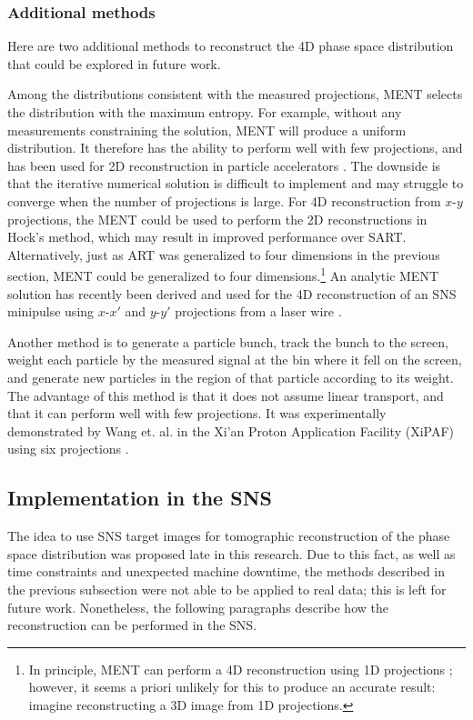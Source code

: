 \subsubsection{Additional methods}

Here are two additional methods to reconstruct the 4D phase space distribution that could be explored in future work.

Among the distributions consistent with the measured projections, MENT selects the distribution with the maximum entropy. For example, without any measurements constraining the solution, MENT will produce a uniform distribution. It therefore has the ability to perform well with few projections, and has been used for 2D reconstruction in particle accelerators \cite{Hock2013a}. The downside is that the iterative numerical solution is difficult to implement and may struggle to converge when the number of projections is large. For 4D reconstruction from $x$-$y$ projections, the MENT could be used to perform the 2D reconstructions in Hock's method, which may result in improved performance over SART. Alternatively, just as ART was generalized to four dimensions in the previous section, MENT could be generalized to four dimensions.\footnote{In principle, MENT can perform a 4D reconstruction using 1D projections \cite{Sander1979}; however, it seems a priori unlikely for this to produce an accurate result: imagine reconstructing a 3D image from 1D projections.} An analytic MENT solution has recently been derived and used for the 4D reconstruction of an SNS minipulse using $x$-$x'$ and $y$-$y'$ projections from a laser wire \cite{Wong-forthcoming}. 

Another method is to generate a particle bunch, track the bunch to the screen, weight each particle by the measured signal at the bin where it fell on the screen, and generate new particles in the region of that particle according to its weight. The advantage of this method is that it does not assume linear transport, and that it can perform well with few projections. It was experimentally demonstrated by Wang et. al. in the Xi’an Proton Application Facility (XiPAF) using six projections \cite{Wang2019}. 



\subsection{Implementation in the SNS}

The idea to use SNS target images for tomographic reconstruction of the phase space distribution was proposed late in this research. Due to this fact, as well as time constraints and unexpected machine downtime, the methods described in the previous subsection were not able to be applied to real data; this is left for future work. Nonetheless, the following paragraphs describe how the reconstruction can be performed in the SNS.


